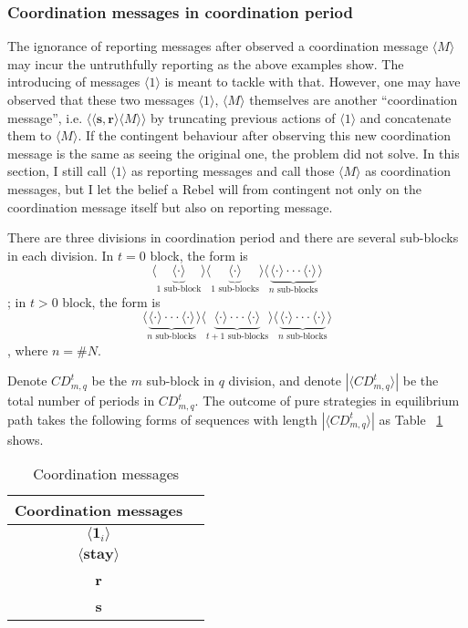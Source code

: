 \documentclass[12pt,letter]{article}
\theoremstyle{definition}
\theoremstyle{remark}
\theoremstyle{claim}
\begin{document}
\subsubsection*{Coordination messages in coordination period}

The ignorance of reporting messages after observed a coordination message $\langle M \rangle$ may incur the untruthfully reporting as the above examples show. The introducing of messages $\langle 1 \rangle$ is meant to tackle with that. However, one may have observed that these two messages $\langle 1 \rangle$, $\langle M \rangle$ themselves are another ``coordination message'', i.e. $\langle\langle \textbf{s}, \textbf{r} \rangle\langle M \rangle\rangle$ by truncating previous actions of $\langle 1 \rangle$ and concatenate them to $\langle M \rangle$. If the contingent behaviour after observing this new coordination message is the same as seeing the original one, the problem did not solve. In this section, I still call $\langle 1 \rangle$ as reporting messages and call those $\langle M \rangle$ as coordination messages, but I let the belief a Rebel will from contingent not only on the coordination message itself but also on reporting message.


There are three divisions in coordination period and there are several sub-blocks in each division. In $t=0$ block, the form is
\[\langle\underbrace{\langle \cdot \rangle }_{\text{$1$ sub-block}}\rangle \langle\underbrace{\langle \cdot \rangle }_{\text{$1$ sub-blocks}} \rangle \langle\underbrace{\langle \cdot \rangle \cdot \cdot \cdot \langle \cdot \rangle}_{\text{$n$ sub-blocks}}\rangle\] 
; in $t>0$ block, the form is
\[\langle\underbrace{\langle \cdot \rangle \cdot \cdot \cdot \langle \cdot \rangle}_{\text{$n$ sub-blocks}}\rangle \langle\underbrace{\langle \cdot \rangle \cdot \cdot \cdot \langle \cdot \rangle}_{\text{$t+1$ sub-blocks}} \rangle \langle\underbrace{\langle \cdot \rangle \cdot \cdot \cdot \langle \cdot \rangle}_{\text{$n$ sub-blocks}}\rangle\] 
, where $n=\# N$. 


Denote $CD^t_{m,q}$ be the $m$ sub-block in $q$ division, and denote $|\langle CD^t_{m,q} \rangle|$ be the total number of periods in $CD^t_{m,q}$.  The outcome of pure strategies in equilibrium path takes the following forms of sequences with length $|\langle CD^t_{m,q} \rangle|$ as Table ~\ref{Table_msg_coordination} shows.
\begin{table}[t]
\caption{Coordination messages}
\label{Table_msg_coordination}
\begin{center}

\begin{tabular}{cc }
Coordination messages		&   \\
\hline
$\langle \mathbf{1}_i \rangle$ 	& 	 \\
$\langle \textbf{stay} \rangle$	&   \\
\textbf{r}									& 	\\
\textbf{s}									& 	\\
\end{tabular}
\end{center}
\end{table}
\end{document}
